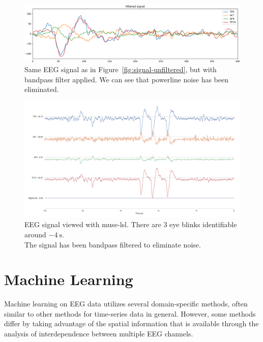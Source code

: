     \begin{figure}[H]
        \includegraphics[width=14cm]{img/raw-signal-postfilter.png}
        \caption{Same EEG signal as in Figure~\ref{fig:signal-unfiltered}, but with bandpass filter applied. We can see that powerline noise has been eliminated.}\label{fig:signal-filtered}
    \end{figure}


    \begin{landscape}
        \begin{figure}
            \begin{center}
                \includegraphics[trim=60 50 50 60,clip,width=22cm]{img/muselsl-signal.png}
            \end{center}
            \caption{EEG signal viewed with muse-lsl. There are 3 eye blinks identifiable around $\SI{-4}{\second}$.\\ The signal has been bandpass filtered to eliminate noise.}\label{fig:muselsl-signal}
        \end{figure}
    \end{landscape}

\section{Machine Learning}

    Machine learning on EEG data utilizes several domain-specific methods, often similar to other methods for time-series data in general. However, some methods differ by taking advantage of the spatial information that is available through the analysis of interdependence between multiple EEG channels.

